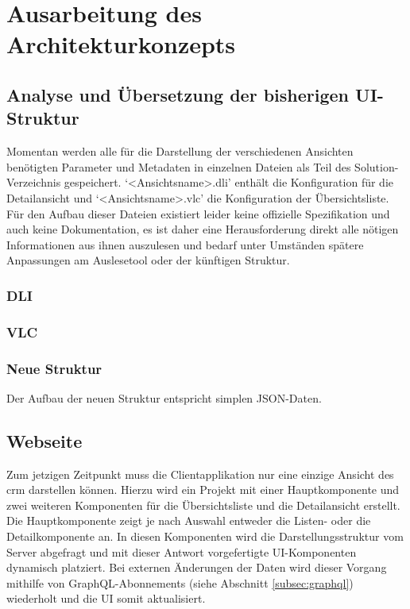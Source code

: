 \chapter{Ausarbeitung des Architekturkonzepts}\label{chap:concept}
\section{Analyse und Übersetzung der bisherigen UI-Struktur}\label{sec:ui_structure_translation}
Momentan werden alle für die Darstellung der verschiedenen Ansichten benötigten Parameter und Metadaten in einzelnen Dateien als Teil des Solution-Verzeichnis gespeichert. `<Ansichtsname>.dli' enthält die Konfiguration für die Detailansicht und `<Ansichtsname>.vlc' die Konfiguration der Übersichtsliste. Für den Aufbau dieser Dateien existiert leider keine offizielle Spezifikation und auch keine Dokumentation, es ist daher eine Herausforderung direkt alle nötigen Informationen aus ihnen auszulesen und bedarf unter Umständen spätere Anpassungen am Auslesetool oder der künftigen Struktur.

\subsection{DLI}
\subsection{VLC}
\subsection{Neue Struktur}
Der Aufbau der neuen Struktur entspricht simplen JSON-Daten. 

\section{Webseite}
Zum jetzigen Zeitpunkt muss die Clientapplikation nur eine einzige Ansicht des \gls{crm} darstellen können. Hierzu wird ein Projekt mit einer Hauptkomponente und zwei weiteren Komponenten für die Übersichtsliste und die Detailansicht erstellt. Die Hauptkomponente zeigt je nach Auswahl entweder die Listen- oder die Detailkomponente an. In diesen Komponenten wird die Darstellungsstruktur vom Server abgefragt und mit dieser Antwort vorgefertigte UI-Komponenten dynamisch platziert. Bei externen Änderungen der Daten wird dieser Vorgang mithilfe von GraphQL-Abonnements (siehe Abschnitt \ref{subsec:graphql}) wiederholt und die UI somit aktualisiert.

